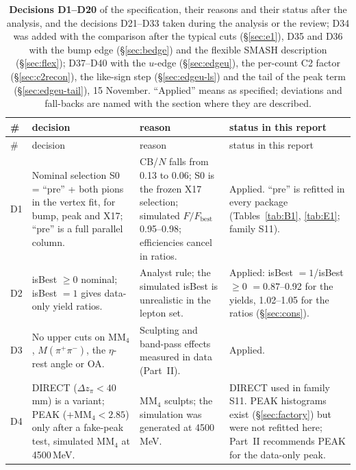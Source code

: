 \documentclass[11pt,a4paper]{article}
\renewcommand{\arraystretch}{1.15}
\newcommand{\Mpipi}{\ensuremath{M(\pi^{+}\pi^{-})}\xspace}
\newcommand{\MMfour}{\ensuremath{\mathrm{MM}_4}\xspace}
\newcommand{\dzpi}{\ensuremath{\Delta z_\pi}\xspace}
\begin{document}
{\footnotesize
\setlength{\tabcolsep}{3pt}
\renewcommand{\arraystretch}{1.08}
\begin{longtable}{@{}>{\raggedright\arraybackslash}p{0.6cm} >{\raggedright\arraybackslash}p{5.2cm} >{\raggedright\arraybackslash}p{4.6cm} >{\raggedright\arraybackslash}p{\dimexpr\textwidth-10.4cm-6\tabcolsep\relax}@{}}
\caption{\textbf{Decisions D1--D20} of the specification, their reasons and their status after the analysis, and the decisions D21--D33
taken during the analysis or the review; D34 was added with the comparison after the typical cuts (\S\ref{sec:e1}), D35 and D36 with the bump
edge (\S\ref{sec:bedge}) and the flexible SMASH description (\S\ref{sec:flex}); D37--D40 with the $u$-edge (\S\ref{sec:edgeu}), the per-count C2
factor (\S\ref{sec:c2recon}), the like-sign step (\S\ref{sec:edgeu-ls}) and the tail of the peak term (\S\ref{sec:edgeu-tail}), 15 November. ``Applied'' means as
specified; deviations and fall-backs are named with the section where they are described.}\label{tab:decisions}\\
\toprule
\# & decision & reason & status in this report \\
\midrule
\endfirsthead
\toprule
\# & decision & reason & status in this report \\
\midrule
\endhead
\bottomrule
\endfoot
D1 & Nominal selection S0 = ``pre'' + both pions in the vertex fit, for bump, peak and X17; ``pre'' is a full parallel column. &
CB/$N$ falls from 0.13 to 0.06; S0 is the frozen X17 selection; simulated $F/F_{\mathrm{best}}$ 0.95--0.98; efficiencies cancel in ratios. &
Applied. ``pre'' is refitted in every package (Tables~\ref{tab:B1}, \ref{tab:E1}; family S11). \\
D2 & isBest $\ge0$ nominal; isBest $=1$ gives data-only yield ratios. & Analyst rule; the simulated isBest is unrealistic in the lepton set. &
Applied: isBest $=1$/isBest $\ge0$ $=0.87$--0.92 for the yields, 1.02--1.05 for the ratios (\S\ref{sec:cons}). \\
D3 & No upper cuts on \MMfour, \Mpipi, the $\eta$-rest angle or OA. & Sculpting and band-pass effects measured in data (Part~II). & Applied. \\
D4 & DIRECT ($\dzpi<40$\,mm) is a variant; PEAK ($+\MMfour<2.85$) only after a fake-peak test, simulated \MMfour at 4500\,MeV. &
\MMfour sculpts; the simulation was generated at 4500\,MeV. & DIRECT used in family S11. PEAK histograms exist (\S\ref{sec:factory}) but were not refitted here; Part~II recommends PEAK for the data-only peak. \\

\end{longtable}}
\end{document}
